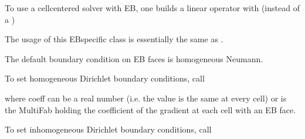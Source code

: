 \documentclass[letterpaper,10pt,english]{sphinxmanual}
\begin{document}
\sphinxAtStartPar
To use a cell\sphinxhyphen{}centered solver with EB, one builds a linear operator
 with  (instead of a )

\begin{sphinxVerbatim}[commandchars=\\\{\}]
   
               
               
               
                
\end{sphinxVerbatim}

\sphinxAtStartPar
The usage of this EB\sphinxhyphen{}specific class is essentially the same as
.

\sphinxAtStartPar
The default boundary condition on EB faces is homogeneous Neumann.

\sphinxAtStartPar
To set homogeneous Dirichlet boundary conditions, call

\begin{sphinxVerbatim}[commandchars=\\\{\}]
 
\end{sphinxVerbatim}

\sphinxAtStartPar
where coeff can be a real number (i.e. the value is the same at every cell)
or is the MultiFab holding the coefficient of the gradient at each cell with an EB face.

\sphinxAtStartPar
To set inhomogeneous Dirichlet boundary conditions, call

\begin{sphinxVerbatim}[commandchars=\\\{\}]
  
\end{sphinxVerbatim}
\end{document}
